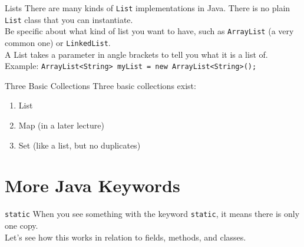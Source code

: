 \documentclass[aspectratio=169]{beamer}
\begin{document}
\begin{frame}{Lists}
There are many kinds of \texttt{List} implementations in Java. There is no plain \texttt{List} class that you can instantiate. \\
\vspace{1em}
Be specific about what kind of list you want to have, such as \texttt{ArrayList} (a very common one) or \texttt{LinkedList}. \\
\vspace{1em}
A List takes a parameter in angle brackets to tell you what it is a list of. \\
\vspace{1em}
Example: \texttt{ArrayList<String> myList = new ArrayList<String>();}
\end{frame}



\begin{frame}{Three Basic Collections}
Three basic collections exist: \\
\vspace{0.5em}
\begin{enumerate}
	\item List
	\item Map (in a later lecture)
	\item Set (like a list, but no duplicates)
\end{enumerate}
\end{frame}


\section*{More Java Keywords}


\begin{frame}{\texttt{static}}
When you see something with the keyword \texttt{static}, it means there is only one copy. \\
\vspace{2em}
Let's see how this works in relation to fields, methods, and classes.
\end{frame}
\end{document}
